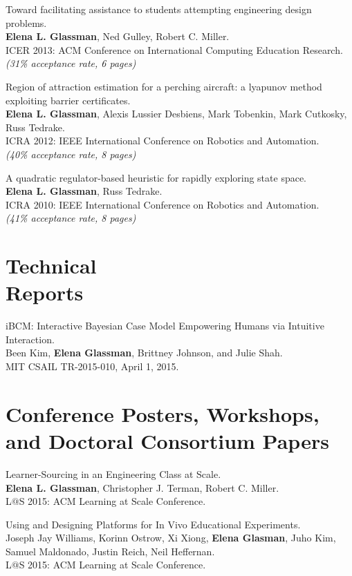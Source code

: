 \documentclass[margin]{res}
\begin{document}
\begin{resume}
Toward facilitating assistance to students attempting engineering design problems.\\
{\bf Elena L. Glassman}, Ned Gulley, Robert C. Miller. \\
ICER 2013: ACM Conference on International Computing Education Research.\\
{\it (31\% acceptance rate, 6 pages)}

Region of attraction estimation for a perching aircraft: a lyapunov method exploiting barrier certificates.\\
{\bf Elena L. Glassman}, Alexis Lussier Desbiens, Mark Tobenkin, Mark Cutkosky, Russ Tedrake.\\
ICRA 2012: IEEE International Conference on Robotics and Automation.\\
{\it (40\% acceptance rate, 8 pages)}

A quadratic regulator-based heuristic for rapidly exploring state space.\\
{\bf Elena L. Glassman}, Russ Tedrake.\\
ICRA 2010: IEEE International Conference on Robotics and Automation.\\ 
{\it (41\% acceptance rate, 8 pages)}

\section{Technical\\ Reports}

iBCM: Interactive Bayesian Case Model Empowering Humans via Intuitive Interaction.\\
Been Kim, {\bf Elena Glassman}, Brittney Johnson, and Julie Shah.\\
MIT CSAIL TR-2015-010, April 1, 2015.

\section{Conference Posters, Workshops, and Doctoral Consortium Papers}

Learner-Sourcing in an Engineering Class at Scale.\\
{\bf Elena L. Glassman}, Christopher J. Terman, Robert C. Miller.\\
L$@$S 2015: ACM Learning at Scale Conference.

Using and Designing Platforms for In Vivo Educational Experiments.\\
Joseph Jay Williams, Korinn Ostrow, Xi Xiong, {\bf Elena Glasman}, Juho Kim, Samuel Maldonado, Justin
Reich, Neil Heffernan.\\
L$@$S 2015: ACM Learning at Scale Conference.


\end{resume}
\end{document}

